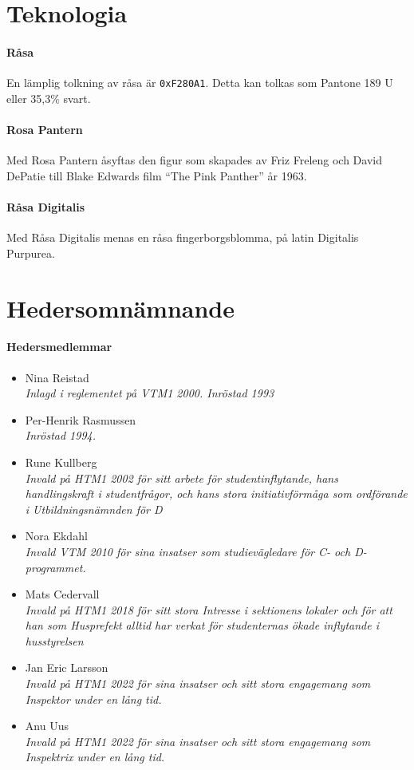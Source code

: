 \documentclass{dsekregulations}
\begin{document}
\coverpage
\section{Teknologia}

\paragraph{Råsa} En lämplig tolkning av råsa är \texttt{0xF280A1}. Detta kan
tolkas som Pantone 189 U eller 35,3\% svart.

\paragraph{Rosa Pantern} Med Rosa Pantern åsyftas den figur som skapades av
Friz Freleng och David DePatie till Blake Edwards film ``The Pink Panther'' år
1963.

\paragraph{Råsa Digitalis} Med Råsa Digitalis menas en råsa fingerborgsblomma,
på latin Digitalis Purpurea.

\section{Hedersomnämnande}

\paragraph{Hedersmedlemmar}

\begin{itemize}
\item Nina Reistad \\
  \emph{Inlagd i reglementet på VTM1 2000. Inröstad 1993}
\item Per-Henrik Rasmussen \\ \emph{Inröstad 1994.}
\item Rune Kullberg \\
  \emph{Invald på HTM1 2002 för sitt arbete för studentinflytande, hans
  handlingskraft i studentfrågor, och hans stora initiativförmåga som
  ordförande i Utbildningsnämnden för D}
\item Nora Ekdahl \\
  \emph{Invald VTM 2010 för sina insatser som studievägledare för C- och
  D-programmet.}
\item Mats Cedervall \\
  \emph{Invald på HTM1 2018 för sitt stora Intresse i sektionens lokaler och
  för att han som Husprefekt alltid har verkat för studenternas ökade
  inflytande i husstyrelsen}
\item Jan Eric Larsson \\
  \emph{Invald på HTM1 2022 för sina insatser och sitt stora engagemang som
  Inspektor under en lång tid.}
\item Anu Uus \\
  \emph{Invald på HTM1 2022 för sina insatser och sitt stora engagemang som
  Inspektrix under en lång tid.}
\end{itemize}
\end{document}
